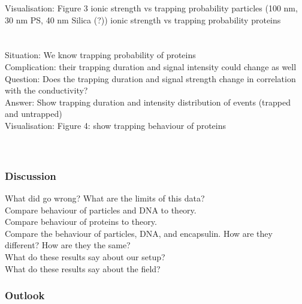 	Visualisation: Figure 3 ionic strength vs trapping probability particles (100 nm, 30 nm PS, 40 nm Silica (?)) ionic strength vs trapping probability proteins \\
    \\\\
    Situation: We know trapping probability of proteins\\
	Complication: their trapping duration and signal intensity could change as well \\
	Question: Does the trapping duration and signal strength change in correlation with the conductivity?\\
	Answer: Show trapping duration and intensity distribution of events (trapped and untrapped)\\
	Visualisation: Figure 4: show trapping behaviour of proteins \\
    \\\\
\subsubsection{Discussion}
What did go wrong? What are the limits of this data?\\
Compare behaviour of particles and DNA to theory.\\
Compare behaviour of proteins to theory.\\
Compare the behaviour of particles, DNA, and encapsulin. How are they different? How are they the same? \\
What do these results say about our setup? \\
What do these results say about the field?\\
\subsubsection{Outlook}
\FloatBarrier
